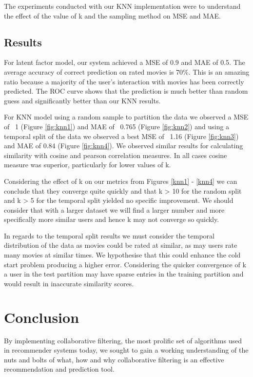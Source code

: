\documentclass[12pt]{article}
\begin{document}
The experiments conducted with our KNN implementation were to understand the effect of the value of k and the sampling method on MSE and MAE.

\subsection{Results}

For latent factor model, our system achieved a MSE of 0.9 and MAE of 0.5. The average accuracy of correct prediction on rated movies is 70\%. This is an amazing ratio because a majority of the user's interaction with movies has been correctly predicted. The ROC curve shows that the prediction is much better than random guess and significantly better than our KNN results.

For KNN model using a random sample to partition the data we observed a MSE of ~1 (Figure \ref{fig:knn1}) and MAE of ~0.765 (Figure \ref{fig:knn2}) and using a temporal split of the data we observed a best MSE of ~1.16 (Figure \ref{fig:knn3}) and MAE of 0.84 (Figure \ref{fig:knn4}). We observed similar results for calculating similarity with cosine and pearson correlation measures. In all cases cosine measure was superior, particularly for lower values of k.

Considering the effect of k on our metrics from Figures \ref{knn1} - \ref{knn4} we can conclude that they converge quite quickly and that k > 10 for the random split and k > 5 for the temporal split yielded no specific improvement. We should consider that with a larger dataset we will find a larger number and more specifically more similar users and hence k may not converge so quickly. 

In regards to the temporal split results we must consider the temporal distribution of the data as movies could be rated at similar, as may users rate many movies at similar times. We hypothesise that this could enhance the cold start problem producing a higher error. Considering the quicker convergence of k a user in the test partition may have sparse entries in the training partition and would result in inaccurate similarity scores.    

\section{Conclusion}
By implementing collaborative filtering, the most prolific set of algorithms used in recommender systems today, we sought to gain a working understanding of the nuts and bolts of what, how and why collaborative filtering is an effective recommendation and prediction tool. 
\end{document}
